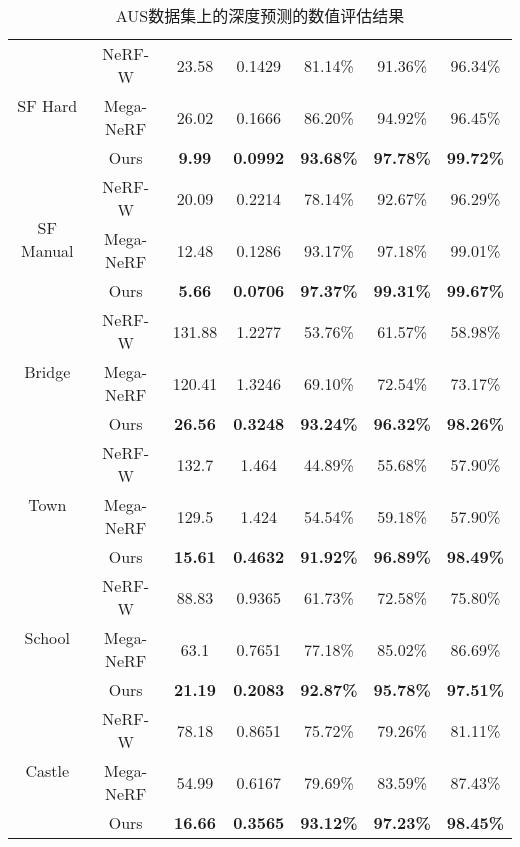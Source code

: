 \begin{table}[p]
{\begin{tabular}{ccccccc}
\multirow{3}{*}{SF Hard}   & NeRF-W    & 23.58          & 0.1429          & 81.14\%          & 91.36\%          & 96.34\%          \\
                           & Mega-NeRF & 26.02          & 0.1666          & 86.20\%          & 94.92\%          & 96.45\%          \\
                           & Ours      & \textbf{9.99}  & \textbf{0.0992} & \textbf{93.68\%} & \textbf{97.78\%} & \textbf{99.72\%} \\ \hline
\multirow{3}{*}{SF Manual} & NeRF-W    & 20.09          & 0.2214          & 78.14\%          & 92.67\%          & 96.29\%          \\
                           & Mega-NeRF & 12.48          & 0.1286          & 93.17\%          & 97.18\%          & 99.01\%          \\
                           & Ours      & \textbf{5.66}  & \textbf{0.0706} & \textbf{97.37\%} & \textbf{99.31\%} & \textbf{99.67\%} \\ \hline
\multirow{3}{*}{Bridge}    & NeRF-W    & 131.88         & 1.2277          & 53.76\%          & 61.57\%          & 58.98\%          \\
                           & Mega-NeRF & 120.41         & 1.3246          & 69.10\%          & 72.54\%          & 73.17\%          \\
                           & Ours      & \textbf{26.56} & \textbf{0.3248} & \textbf{93.24\%} & \textbf{96.32\%} & \textbf{98.26\%} \\ \hline
\multirow{3}{*}{Town}      & NeRF-W    & 132.7          & 1.464           & 44.89\%          & 55.68\%          & 57.90\%          \\
                           & Mega-NeRF & 129.5          & 1.424           & 54.54\%          & 59.18\%          & 57.90\%          \\
                           & Ours      & \textbf{15.61} & \textbf{0.4632} & \textbf{91.92\%} & \textbf{96.89\%} & \textbf{98.49\%} \\ \hline
\multirow{3}{*}{School}    & NeRF-W    & 88.83          & 0.9365          & 61.73\%          & 72.58\%          & 75.80\%          \\
                           & Mega-NeRF & 63.1           & 0.7651          & 77.18\%          & 85.02\%          & 86.69\%          \\
                           & Ours      & \textbf{21.19} & \textbf{0.2083} & \textbf{92.87\%} & \textbf{95.78\%} & \textbf{97.51\%} \\ \hline
\multirow{3}{*}{Castle}    & NeRF-W    & 78.18          & 0.8651          & 75.72\%          & 79.26\%          & 81.11\%          \\
                           & Mega-NeRF & 54.99          & 0.6167          & 79.69\%          & 83.59\%          & 87.43\%          \\
                           & Ours      & \textbf{16.66} & \textbf{0.3565} & \textbf{93.12\%} & \textbf{97.23\%} & \textbf{98.45\%} \\ \hline
\end{tabular}%
}
\caption{AUS数据集上的深度预测的数值评估结果}
\label{tab:aus-depth-quant}
\end{table}